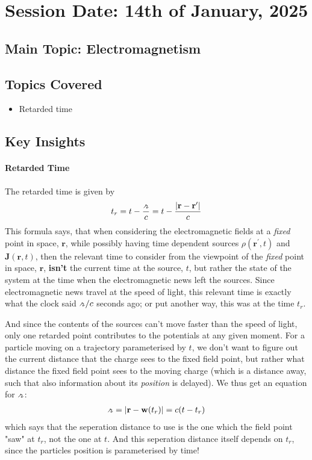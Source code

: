 \section{Session Date: 14th of January, 2025}
\subsection*{Main Topic: Electromagnetism}
\subsection*{Topics Covered}
\begin{itemize}
    \item Retarded time
\end{itemize}

\subsection*{Key Insights}
\paragraph{Retarded Time} The retarded time is given by \begin{align*}
    t_r = t - \frac{\griffr[2]}{c} = t - \frac{\left| \mathbf{r} - \mathbf{r}^{\prime}\right| }{c}
\end{align*}
This formula says, that when considering the electromagnetic fields at a \textit{fixed} point in space, \(\mathbf{r}\), while possibly having time dependent sources \(\rho (\mathbf{r}^{\prime}, t)\) and \(\mathbf{J}(\mathbf{r}, t)\), then the relevant time to consider from the viewpoint of the \textit{fixed} point in space, \(\mathbf{r}\), \textbf{isn't} the current time at the source, \(t\), but rather the state of the system at the time when the electromagnetic news left the sources. Since electromagnetic news travel at the speed of light, this relevant time is exactly what the clock said \(\griffr[2] / c\) seconds ago; or put another way, this was at the time \(t_r\). 

And since the contents of the sources can't move faster than the speed of light, only one retarded point contributes to the potentials at any given moment. For a particle moving on a trajectory parameterised by \(t\), we don't want to figure out the current distance that the charge sees to the fixed field point, but rather what distance the fixed field point sees to the moving charge (which is a distance away, such that also information about its \textit{position} is delayed). We thus get an equation for \(\griffr[2]\): \begin{align*}
    \griffr[2] = \left| \mathbf{r} - \mathbf{w}(t_r) \right| = c (t - t_r)
\end{align*}   
which says that the seperation distance to use is the one which the field point "saw" at \(t_r\), not the one at \(t\). And this seperation distance itself depends on \(t_r\), since the particles position is parameterised by time!  
